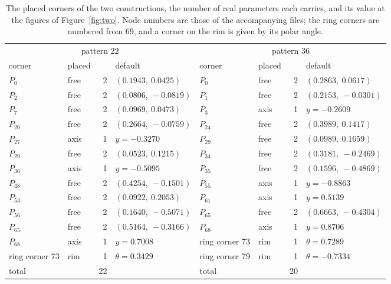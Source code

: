 \begin{table}[h]
\centering\footnotesize
\begin{tabular}{@{}llrl@{\qquad}llrl@{}}
\toprule
\multicolumn{4}{c}{pattern $22$} & \multicolumn{4}{c}{pattern $36$} \\
\cmidrule(r){1-4}\cmidrule(l){5-8}
corner & placed & & default & corner & placed & & default \\ \midrule
$P_{0}$ & free & 2 & $(0.1943,\ 0.0425)$ & $P_{0}$ & free & 2 & $(0.2863,\ 0.0617)$ \\
$P_{2}$ & free & 2 & $(0.0806,\ -0.0819)$ & $P_{1}$ & free & 2 & $(0.2153,\ -0.0301)$ \\
$P_{7}$ & free & 2 & $(0.0969,\ 0.0473)$ & $P_{3}$ & axis & 1 & $y = -0.2609$ \\
$P_{20}$ & free & 2 & $(0.2664,\ -0.0759)$ & $P_{24}$ & free & 2 & $(0.3989,\ 0.1417)$ \\
$P_{27}$ & axis & 1 & $y = -0.3270$ & $P_{29}$ & free & 2 & $(0.0989,\ 0.1659)$ \\
$P_{29}$ & free & 2 & $(0.0523,\ 0.1215)$ & $P_{34}$ & free & 2 & $(0.3181,\ -0.2469)$ \\
$P_{36}$ & axis & 1 & $y = -0.5095$ & $P_{35}$ & free & 2 & $(0.1596,\ -0.4869)$ \\
$P_{48}$ & free & 2 & $(0.4254,\ -0.1501)$ & $P_{55}$ & axis & 1 & $y = -0.8863$ \\
$P_{53}$ & free & 2 & $(0.0922,\ 0.2053)$ & $P_{61}$ & axis & 1 & $y = 0.5139$ \\
$P_{56}$ & free & 2 & $(0.1640,\ -0.5071)$ & $P_{65}$ & free & 2 & $(0.6663,\ -0.4304)$ \\
$P_{65}$ & free & 2 & $(0.5164,\ -0.3166)$ & $P_{68}$ & axis & 1 & $y = 0.8706$ \\
$P_{68}$ & axis & 1 & $y = 0.7008$ & ring corner 73 & rim & 1 & $\theta = 0.7289$ \\
ring corner 73 & rim & 1 & $\theta = 0.3429$ & ring corner 79 & rim & 1 & $\theta = -0.7334$ \\
\midrule
total & & 22 & & total & & 20 & \\ \bottomrule
\end{tabular}
\caption{The placed corners of the two constructions, the number of real parameters each carries, and its value at the figures of Figure~\ref{fig:two}. Node numbers are those of the accompanying files; the ring corners are numbered from $69$, and a corner on the rim is given by its polar angle.}
\label{tab:seeds}
\end{table}

